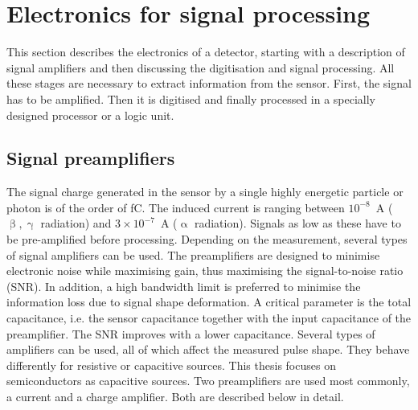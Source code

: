 \section{Electronics for signal processing} %
\label{sec:elecsigproc}
This section describes the electronics of a detector, starting with a description of signal amplifiers and then discussing the digitisation and signal processing. All these stages are necessary to extract information from the sensor. First, the signal has to be amplified. Then it is digitised and finally processed in a specially designed processor or a logic unit.

\subsection{Signal preamplifiers}
The signal charge generated in the sensor by a single highly energetic particle or photon is of the order of fC. The induced current is ranging between $10^{-8}$~A ($\upbeta, \upgamma$ radiation) and $3\times10^{-7}$~A ($\upalpha$ radiation). Signals as low as these have to be pre-amplified before processing. Depending on the measurement, several types of signal amplifiers can be used. The preamplifiers are designed to minimise electronic noise while maximising gain, thus maximising the signal-to-noise ratio (SNR). In addition, a high bandwidth limit is preferred to minimise the information loss due to signal shape deformation. A critical parameter is the total capacitance, i.e. the sensor capacitance together with the input capacitance of the preamplifier. The SNR improves with a lower capacitance. Several types of amplifiers can be used, all of which affect the measured pulse shape. They behave differently for resistive or capacitive sources. This thesis focuses on semiconductors as capacitive sources. Two preamplifiers are used most commonly, a current and a charge amplifier. Both are described below in detail. 

